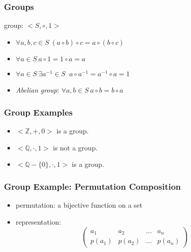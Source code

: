 \documentclass[dvipsnames]{beamer}
\begin{document}
\begin{frame}
  \frametitle{Groups}

  \begin{definition}
    \alert{group}: $<S,\circ,1>$

    \begin{itemize}
      \item $\forall a,b,c \in S~(a \circ b) \circ c = a \circ (b \circ c)$
      \item $\forall a \in S~a \circ 1 = 1 \circ a = a$
      \item $\forall a \in S~\exists a^{-1} \in S~$
        $a \circ a^{-1} = a^{-1} \circ a = 1$

      \pause
      \medskip
      \item \emph{Abelian group}: $\forall a,b \in S~a \circ b = b \circ a$
    \end{itemize}
  \end{definition}
\end{frame}

\begin{frame}
  \frametitle{Group Examples}

  \begin{example}
    \begin{itemize}
      \item $<\mathbb{Z},+,0>$ is a group.

      \pause
      \medskip
      \item $<\mathbb{Q},\cdot,1>$ is not a group.
      \item $<\mathbb{Q}-\{0\},\cdot,1>$ is a group.
    \end{itemize}
  \end{example}
\end{frame}

\begin{frame}
  \frametitle{Group Example: Permutation Composition}

  \begin{itemize}
    \item permutation: a bijective function on a set

    \medskip
    \item representation:
    \[\left(
      \begin{array}{cccc}
         a_1   &  a_2   & \dots &  a_n\\
        p(a_1) & p(a_2) & \dots & p(a_n)
      \end{array}
    \right)\]
  \end{itemize}
\end{frame}
\end{document}
